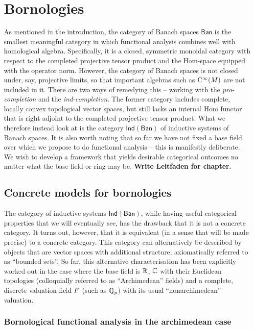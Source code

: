 \chapter{Bornologies}

As mentioned in the introduction, the category of Banach spaces \(\mathsf{Ban}\) is the smallest meaningful category in which functional analysis combines well with homological algebra. Specifically, it is a closed, symmetric monoidal category with respect to the completed projective tensor product and the Hom-space equipped with the operator norm.  However, the category of Banach spaces is not closed under, say, projective limits, so that important algebras such as \(\mathrm{C}^\infty(M)\) are not included in it. There are two ways of remedying this -- working with the \emph{pro-completion} and the \emph{ind-completion}. The former category includes complete, locally convex topological vector spaces, but still lacks an internal Hom functor that is right adjoint to the completed projective tensor product. What we therefore instead look at is the category \(\mathsf{Ind}(\mathsf{Ban})\) of inductive systems of Banach spaces. It is also worth noting that so far we have not fixed a base field over which we propose to do functional analysis -- this is manifestly deliberate. We wish to develop a framework that yields desirable categorical outcomes no matter what the base field or ring may be.  \textbf{Write Leitfaden for chapter.}


\section{Concrete models for bornologies}

The category of inductive systems \(\mathsf{Ind}(\mathsf{Ban})\), while having useful categorical properties that we will eventually see, has the drawback that it is not a concrete category. It turns out, however, that it is equivalent (in a sense that will be made precise) to a concrete category. This category can alternatively be described by objects that are vector spaces with additional structure, axiomatically referred to as ``bounded sets''. So far, this alternative characterisation has been explicitly worked out in the case where the base field is \(\mathbb R\), \(\mathbb C\) with their Euclidean topologies (colloquially referred to as ``Archimedean'' fields) and a complete, discrete valuation field \(F\) (such as \(\mathbb Q_p\)) with its usual ``nonarchimedean'' valuation.  

\subsection{Bornological functional analysis in the archimedean case}


